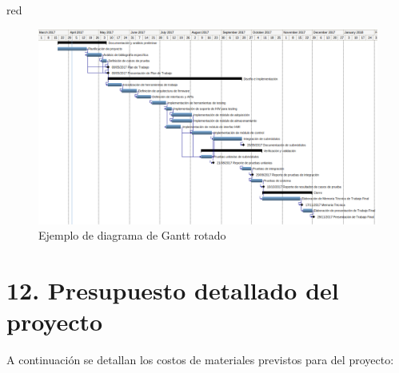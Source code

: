 \documentclass[
11pt, %
]{charter}
\begin{document}
\begin{consigna}{red}
\begin{landscape}
\begin{figure}[htpb]
\centering 
\includegraphics[height=.85\textheight]{./Figuras/Gantt-2.png}
\caption{Ejemplo de diagrama de Gantt rotado}
\label{fig:diagGantt}
\end{figure}

\end{landscape}

\end{consigna}


\section{12. Presupuesto detallado del proyecto}
\label{sec:presupuesto}

A continuación se detallan los costos de materiales previstos para del proyecto:
\end{document}
